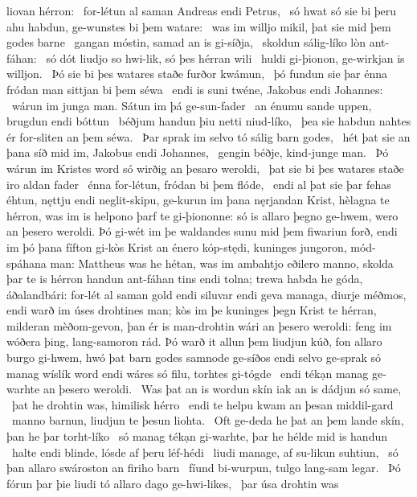 liovan hérron: \hld\ for-létun al saman
Andreas endi Petrus, \hld\ só hwat só sie bi þeru ahu habdun,
ge-wunstes bi þem watare: \hld\ was im willjo mikil,
þat sie mid þem godes barne \hld\ gangan móstin,
samad an is gi-síðja, \hld\ skoldun sálig-líko
lòn ant-fáhan: \hld\ só dót liudjo so hwi-lik,
só þes hérran wili \hld\ huldi gi-þionon,
ge-wirkjan is willjon. \hld\ Þó sie bi þes watares staðe
furðor kwámun, \hld\ þó fundun sie þar énna fródan man
sittjan bi þem séwa \hld\ endi is suni twéne,
Jakobus endi Johannes: \hld\ wárun im junga man.
Sátun im þá ge-sun-fader \hld\ an énumu sande uppen,
brugdun endi bóttun \hld\ béðjum handun
þiu netti niud-líko, \hld\ þea sie habdun nahtes ér
for-sliten an þem séwa. \hld\ Þar sprak im selvo tó
sálig barn godes, \hld\ hét þat sie an þana síð mid im,
Jakobus endi Johannes, \hld\ gengin béðje,
kind-junge man. \hld\ Þó wárun im Kristes word
só wirðig an þesaro weroldi, \hld\ þat sie bi þes watares staðe
iro aldan fader \hld\ énna for-létun,
fródan bi þem flóde, \hld\ endi al þat sie þar fehas éhtun,
nęttju endi neglit-skipu, \hld\ ge-kurun im þana nęrjandan Krist,
hèlagna te hérron, \hld\ was im is helpono þarf
te gi-þiononne: \hld\ só is allaro þegno ge-hwem,
wero an þesero weroldi. \hld\ Þó gi-wét im þe waldandes sunu
mid þem fiwariun forð, \hld\ endi im þó þana fífton gi-kòs
Krist an énero kóp-stędi, \hld\ kuninges jungoron,
mód-spáhana man: Mattheus was he hétan,
was im ambahtjo eðilero manno,
skolda þar te is hérron handun ant-fáhan
tins endi tolna; trewa habda he góda,
áðalandbári: for-lét al saman
gold endi siluvar endi geva managa,
diurje méðmos, endi warð im úses drohtines man;
kòs im þe kuninges þegn Krist te hérran,
milderan mèðom-gevon, þan ér is man-drohtin
wári an þesero weroldi: feng im wóðera þing,
lang-samoron rád. Þó warð it allun þem liudjun kúð,
fon allaro burgo gi-hwem, hwó þat barn godes
samnode ge-síðos endi selvo ge-sprak
só manag wíslík word endi wáres só filu,
torhtes gi-tógde \hld\ endi tékạn manag
ge-warhte an þesero weroldi. \hld\ Was þat an is wordun skín
iak an is dádjun só same, \hld\ þat he drohtin was,
himilisk hérro \hld\ endi te helpu kwam
an þesan middil-gard \hld\ manno barnun,
liudjun te þesun liohta. \hld\ Oft ge-deda he þat an þem lande skín,
þan he þar torht-líko \hld\ só manag tékạn gi-warhte,
þar he hélde mid is handun \hld\ halte endi blinde,
lósde af þeru léf-hédi \hld\ liudi manage,
af su-likun suhtiun, \hld\ só þan allaro swároston
an firiho barn \hld\ fíund bi-wurpun,
tulgo lang-sam legar. \hld\ Þó fórun þar þie liudi tó
allaro dago ge-hwi-likes, \hld\ þar úsa drohtin was
